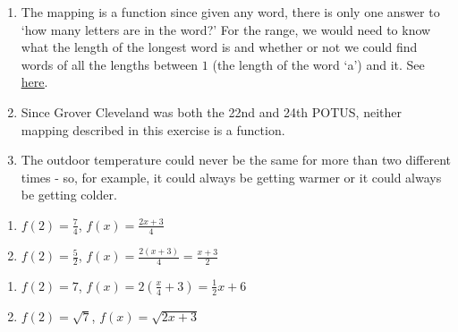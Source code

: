 \begin{enumerate}

\setcounter{enumi}{\value{HW}}

\item    The mapping is a function since given any word, there is only one answer to `how many letters are in the word?'  For the range, we would need to know what the length of the longest word is and whether or not we could find words of all the lengths between $1$ (the length of the word `a') and it.  See \href{https://en.wikipedia.org/wiki/Longest_word_in_English}{\underline{here}}.

\item  Since Grover Cleveland was both the 22nd and 24th POTUS, neither mapping described in this exercise is a function.

\item  The outdoor temperature could never be the same for more than two different times - so, for example, it could always be getting warmer or it could always be getting colder.

\setcounter{HW}{\value{enumi}}

\end{enumerate}

\begin{multicols}{2}
\begin{enumerate}
\setcounter{enumi}{\value{HW}}

\item $f(2) = \frac{7}{4}$, $f(x) = \frac{2x+3}{4}$

\item $f(2) = \frac{5}{2}$, $f(x) = \frac{2(x+3)}{4} = \frac{x+3}{2}$  

\setcounter{HW}{\value{enumi}}
\end{enumerate}
\end{multicols}

\begin{multicols}{2}
\begin{enumerate}
\setcounter{enumi}{\value{HW}}

\item $f(2) = 7$, $f(x) = 2\left(\frac{x}{4} + 3\right) = \frac{1}{2} x + 6$   

\item $f(2) = \sqrt{7}$, $f(x) = \sqrt{2x+3}$ 

\setcounter{HW}{\value{enumi}}
\end{enumerate}
\end{multicols}

